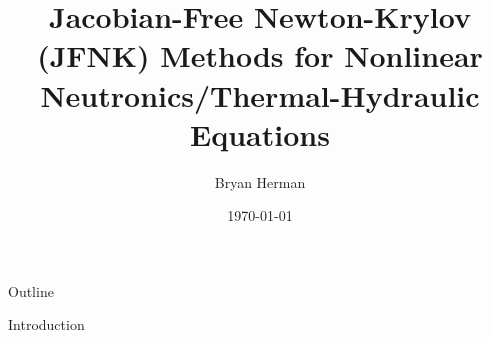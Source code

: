\documentclass{beamer}
\title[JFNK Methods for Coupled Nonlinear Systems]{Jacobian-Free Newton-Krylov (JFNK) Methods for Nonlinear Neutronics/Thermal-Hydraulic Equations}
\author[]{Bryan Herman}
\institute[\insertpagenumber]{}
\date{\today}
\begin{document}

\frame{\titlepage}

\begin{frame}{Outline}
  \tableofcontents{}
\end{frame}

\begin{section}{Introduction}

\begin{comment}
\begin{frame}{Motivation and Objective}

  \begin{customlist}{2ex}{0pt}

    \item Eventually will be part of thesis work
    \vfill\item JFNK method not currently used in nuclear reactor 
		analysis
    \vfill\item Incorporates a lot of ideas from 2.29 class
    \vfill\item Implement JFNK framework for coupled physics
    \vfill\item Test implementation on a simple model 

  \end{customlist}


\end{comment}
\end{section}
\end{document}
